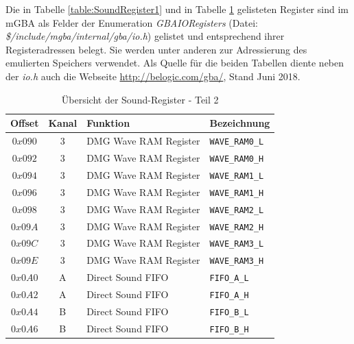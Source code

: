 \documentclass[11pt,a4paper]{scrartcl}
\begin{document}
Die in Tabelle \ref{table:SoundRegister1} und in Tabelle \ref{table:SoundRegister2} gelisteten Register sind im mGBA als Felder der Enumeration \textit{GBAIORegisters} (Datei: \textit{\$/include/mgba/internal/gba/io.h}) gelistet und entsprechend ihrer Registeradressen belegt. Sie werden unter anderen zur Adressierung des emulierten Speichers verwendet. Als Quelle f\"ur die beiden Tabellen diente neben der \textit{io.h} auch die Webseite \url{http://belogic.com/gba/}, Stand Juni 2018.

\begin{table}[h]
    \centering
    \begin{tabular}{ c | c | p{10cm} | l }
        \textbf{Offset} & \textbf{Kanal} & \textbf{Funktion} & \textbf{Bezeichnung} \\
        \hline
        $0x090$ & 3 & DMG Wave RAM Register & \verb|WAVE_RAM0_L| \\
        \hline
        $0x092$ & 3 & DMG Wave RAM Register & \verb|WAVE_RAM0_H| \\
        \hline
        $0x094$ & 3 & DMG Wave RAM Register & \verb|WAVE_RAM1_L| \\
        \hline
        $0x096$ & 3 & DMG Wave RAM Register & \verb|WAVE_RAM1_H| \\
        \hline
        $0x098$ & 3 & DMG Wave RAM Register & \verb|WAVE_RAM2_L| \\
        \hline
        $0x09A$ & 3 & DMG Wave RAM Register & \verb|WAVE_RAM2_H| \\
        \hline
        $0x09C$ & 3 & DMG Wave RAM Register & \verb|WAVE_RAM3_L| \\
        \hline
        $0x09E$ & 3 & DMG Wave RAM Register & \verb|WAVE_RAM3_H| \\
        \hline
        $0x0A0$ & A & Direct Sound FIFO & \verb|FIFO_A_L| \\
        \hline
        $0x0A2$ & A & Direct Sound FIFO & \verb|FIFO_A_H| \\
        \hline
        $0x0A4$ & B & Direct Sound FIFO & \verb|FIFO_B_L| \\
        \hline
        $0x0A6$ & B & Direct Sound FIFO & \verb|FIFO_B_H| \\
    \end{tabular}
    \caption{\"Ubersicht der Sound-Register - Teil 2}
    \label{table:SoundRegister2}
\end{table}

\newpage

\end{document}
